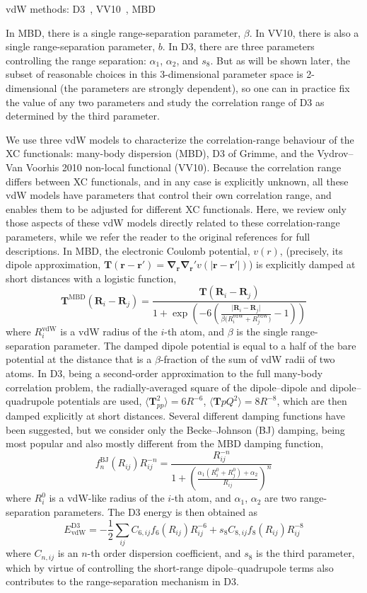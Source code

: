 vdW methods: D3~\cite{GrimmeJCP10}, VV10~\cite{VydrovJCP10a}, MBD

In MBD, there is a single range-separation parameter, $\beta$.
In VV10, there is also a single range-separation parameter, $b$.
In D3, there are three parameters controlling the range separation: $\alpha_1$, $\alpha_2$, and $s_8$.
But as will be shown later, the subset of reasonable choices in this 3-dimensional parameter space is 2-dimensional (the parameters are strongly dependent), so one can in practice fix the value of any two parameters and study the correlation range of D3 as determined by the third parameter.

We use three vdW models to characterize the correlation-range behaviour of the XC functionals: many-body dispersion (MBD), D3 of Grimme, and the Vydrov--Van Voorhis 2010 non-local functional (VV10).
Because the correlation range differs between XC functionals, and in any case is explicitly unknown, all these vdW models have parameters that control their own correlation range, and enables them to be adjusted for different XC functionals.
Here, we review only those aspects of these vdW models directly related to these correlation-range parameters, while we refer the reader to the original references for full descriptions.
In MBD, the electronic Coulomb potential, $v(r)$, (precisely, its dipole approximation, $\mathbf T(\mathbf r-\mathbf r')=\boldsymbol\nabla_\mathbf r\boldsymbol\nabla_\mathbf r'v(\lvert\mathbf r-\mathbf r'\rvert)$) is explicitly damped at short distances with a logistic function,
\[
  \mathbf T^\text{MBD}(\mathbf R_i-\mathbf R_j)=\frac{\mathbf T(\mathbf R_i-\mathbf R_j)}{1+\exp\left(-6\left(\frac{\lvert\mathbf R_i-\mathbf R_j\rvert}{\beta\big(R_i^\text{vdW}+R_j^\text{vdW}\big )}-1\right)\!\!\right)}
\]
where $R_i^\text{vdW}$ is a vdW radius of the $i$-th atom, and $\beta$ is the single range-separation parameter.
The damped dipole potential is equal to a half of the bare potential at the distance that is a $\beta$-fraction of the sum of vdW radii of two atoms.
In D3, being a second-order approximation to the full many-body correlation problem, the radially-averaged square of the dipole--dipole and dipole--quadrupole potentials are used, $\langle\mathbf T_{pp}^2\rangle=6R^{-6}$, $\langle\mathbf T{pQ}^2\rangle=8R^{-8}$, which are then damped explicitly at short distances.
Several different damping functions have been suggested, but we consider only the Becke--Johnson (BJ) damping, being most popular and also mostly different from the MBD damping function,
\[
  f_n^\text{BJ}(R_{ij})R_{ij}^{-n}=\frac{R_{ij}^{-n}}{1+\left(\frac{\alpha_1(R^0_i+R^0_j)+\alpha_2}{R_{ij}}\right)^n}
\]
where $R^0_i$ is a vdW-like radius of the $i$-th atom, and $\alpha_1$, $\alpha_2$ are two range-separation parameters.
The D3 energy is then obtained as
\[
E^\text{D3}_\text{vdW}=-\frac12\sum_{ij}C_{6,ij}f_6(R_{ij})R_{ij}^{-6}+s_8C_{8,ij}f_8(R_{ij})R_{ij}^{-8}
\]
where $C_{n,ij}$ is an $n$-th order dispersion coefficient, and $s_8$ is the third parameter, which by virtue of controlling the short-range dipole--quadrupole terms also contributes to the range-separation mechanism in D3.

